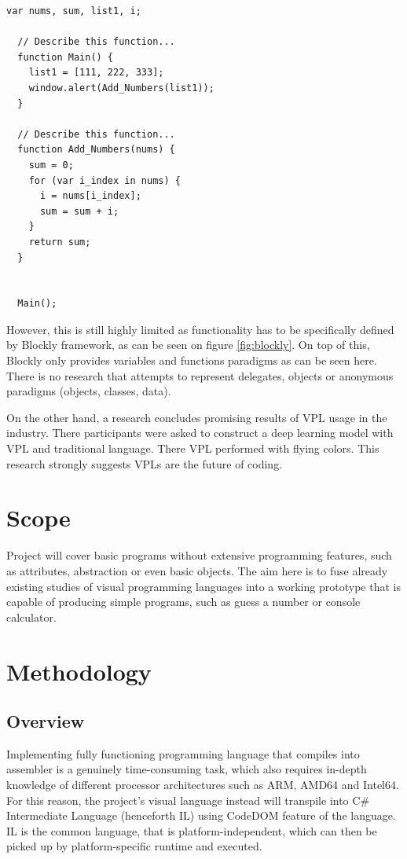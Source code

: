 \documentclass{article}
\begin{document}
  \pagebreak

\begin{lstlisting}[frame=single, label=jsout, caption=Generated JavaScript Code]
  var nums, sum, list1, i;
  
  // Describe this function...
  function Main() {
    list1 = [111, 222, 333];
    window.alert(Add_Numbers(list1));
  }
  
  // Describe this function...
  function Add_Numbers(nums) {
    sum = 0;
    for (var i_index in nums) {
      i = nums[i_index];
      sum = sum + i;
    }
    return sum;
  }
  
  
  Main();
  \end{lstlisting}


However, this is still highly limited as functionality has to be specifically defined by Blockly framework, as can be seen on figure \ref{fig:blockly}. On top of this, Blockly only provides variables and functions paradigms as can be seen here. There is no research that attempts to represent delegates, objects or anonymous paradigms (objects, classes, data).



On the other hand, a research \citep{10.1145/3364183.3364202} concludes promising results of VPL usage in the industry. There participants were asked to construct a deep learning model with VPL and traditional language. There VPL performed with flying colors. This research strongly suggests VPLs are the future of coding.





\section{Scope}
Project will cover basic programs without extensive programming features, such as attributes, abstraction or even basic objects. The aim here is to fuse already existing studies of visual programming languages into a working prototype that is capable of producing simple programs, such as guess a number or console calculator.

\section{Methodology}
\subsection*{Overview}
Implementing fully functioning programming language that compiles into assembler is a genuinely time-consuming task, which also requires in-depth knowledge of different processor architectures such as ARM, AMD64 and Intel64. For this reason, the project's visual language instead will transpile into C\# Intermediate Language (henceforth IL) using CodeDOM feature of the language. IL is the common language, that is platform-independent, which can then be picked up by platform-specific runtime and executed.
\end{document}
